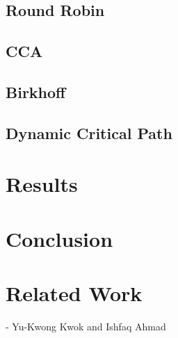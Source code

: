 \documentclass[11pt, oneside]{article}   	%
\begin{document}
\subsection{Round Robin}
\subsection{CCA}
\subsection{Birkhoff}
\subsection{Dynamic Critical Path}

\section{Results}

\section{Conclusion}

\section{Related Work}

- Yu-Kwong Kwok and Ishfaq Ahmad
\end{document}
